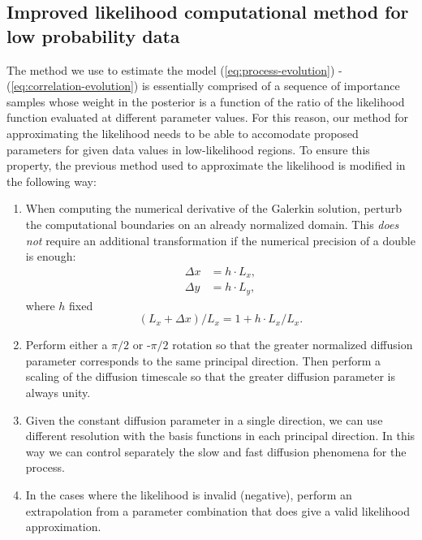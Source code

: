 \documentclass[10pt]{article}
\begin{document}
\subsection{Improved likelihood computational method for low probability data}
The method we use to estimate the model
(\ref{eq:process-evolution}) - (\ref{eq:correlation-evolution}) is
essentially comprised of a sequence of importance samples whose weight
in the posterior is a function of the ratio of the likelihood function
evaluated at different parameter values. For this reason, our method
for approximating the likelihood needs to be able to accomodate
proposed parameters for given data values in low-likelihood
regions. To ensure this property, the previous method used to
approximate the likelihood is modified in the following way:
\begin{enumerate}
\item When computing the numerical derivative of the Galerkin
  solution, perturb the computational boundaries on an already
  normalized domain. This \textit{does not} require an additional
  transformation if the numerical precision of a double is enough:
  \begin{align}
    \Delta x &= h \cdot L_x, \\
    \Delta y &= h \cdot L_y,
  \end{align}
  where $h$ fixed
  \[
    (L_x + \Delta x) / L_x = 1 + h\cdot L_x / L_x.
  \]

\item Perform either a $\pi/2$ or -$\pi/2$ rotation so that the
  greater normalized diffusion parameter corresponds to the same
  principal direction. Then perform a scaling of the diffusion
  timescale so that the greater diffusion parameter is always unity.

\item Given the constant diffusion parameter in a single direction, we
  can use different resolution with the basis functions in each
  principal direction. In this way we can control separately the slow
  and fast diffusion phenomena for the process.

\item In the cases where the likelihood is invalid (negative), perform
  an extrapolation from a parameter combination that does give a valid
  likelihood approximation.
\end{enumerate}
\end{document}
